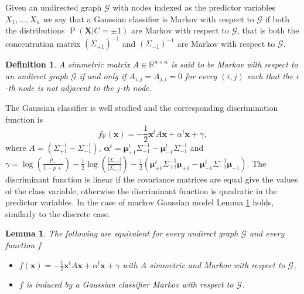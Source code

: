 \documentclass[11pt,a4paper, twoside]{book}
\newtheorem{lemma}{Lemma}[chapter]
\newtheorem{definition}{Definition}[chapter]
\newcommand{\Pp}{\operatorname{P}}
\begin{document}
Given an undirected graph $\mathcal{G}$ with nodes indexed as the predictor variables $X_1,\ldots,X_n$ we say that a Gaussian classifier is Markov with respect to $\mathcal{G}$ if both the distributions $\Pp(\mathbf{X}|C=\pm 1)$ are Markov with respect to $\mathcal{G}$, that is both the concentration matrix $(\Sigma_{+1})^{-1}$ and  $(\Sigma_{-1})^{-1}$ are Markov with respect to $\mathcal{G}$.
\begin{definition}
A simmetric matrix $A \in \mathbb{R}^{n\times n}$ is said to be Markov with respect to an undirect graph $\mathcal{G}$ if and only if $A_{i,j}=A_{j,i}=0$ for every $(i,j)$ such that the $i$-th node is not adjacent to the $j$-th node.
\end{definition}
The Gaussian classifier is well studied\citep{Duda2000} and the corresponding discrimination function is
\begin{equation}
\label{eq:gauss-dicr}
 f_{\Pp}(\mathbf{x}) = -\frac{1}{2} \mathbf{x}^t A \mathbf{x} + \alpha^t \mathbf{x} + \gamma ,
 \end{equation}
where $ A = \left( \Sigma_{+1}^{-1} - \Sigma_{-1}^{-1} \right)$, $\boldsymbol{\alpha}^t = \boldsymbol{\mu}_{+1}^t\Sigma_{+1}^{-1}- \boldsymbol{\mu}_{-1}^t\Sigma_{-1}^{-1}$ and $\gamma = \log\left( \frac{p_+}{1-p+}\right) - \frac{1}{2}\log\left( \frac{|\Sigma_{+1}|}{|\Sigma_{-1}|}\right) - \frac{1}{2}\left( \boldsymbol{\mu}_{+1}^t\Sigma_{+1}^{-1}\boldsymbol{\mu}_{+1} - \boldsymbol{\mu}_{-1}^t\Sigma_{-1}^{-1}\boldsymbol{\mu}_{-1}\right)$.
The discriminant function is linear if the covariance matrices are equal give the values of the class variable, otherwise the discriminant function is quadratic in the predictor variables.
In the case of markov Gaussian model Lemma \ref{lem:gaussian} holds, similarly to the discrete case.


\begin{lemma}
\label{lem:gaussian}
The following are equivalent for every undirect graph $\mathcal{G}$ and every function $f$

\begin{itemize}
\item[(i)] $f(\mathbf{x})= -\frac{1}{2}\mathbf{x}^t A \mathbf{x} + \alpha^t \mathbf{x} + \gamma$ with $A$ simmetric and Markov with respect to $\mathcal{G}$,
\item[(ii)] $f$ is induced by a Gaussian classifier Markov with respect to $\mathcal{G}$.
\end{itemize}
\end{lemma}
\end{document}
